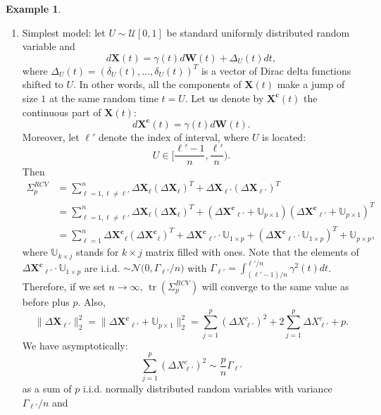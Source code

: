 \documentclass[a4paper,11pt]{article}
\theoremstyle{plain}
\theoremstyle{definition}
\newtheorem{exmp}[thm]{Example}
\newcommand{\tr}{\operatorname{tr}}
\begin{document}
    \begin{exmp} \label{uniform jumps} \
    	\begin{enumerate}
    		\item Simplest model: let $U \sim \mathcal{U}[0, 1]$ be standard uniformly distributed random variable and
    		\begin{equation}
    		d\mathbf{X}(t) = \gamma(t)  d\mathbf{W}(t) + \Delta_U(t)dt,
    		\end{equation}
    		where $\Delta_U(t) = (\delta_U(t), \dots, \delta_U(t))^T$ is a vector of Dirac delta functions shifted to $U$. In other words, all the components of $\mathbf{X}(t)$ make a jump of size $1$ at the same random time $t = U$. Let us denote by $\mathbf{X^c}(t)$ the continuous part of $\mathbf{X}(t)$:
    		\[ d\mathbf{X^c}(t) = \gamma(t) d\mathbf{W}(t). \]
    		Moreover, let $\ell'$ denote the index of interval, where $U$ is located:
    		\[ U \in \bigg[\frac{\ell'-1}{n}, \frac{\ell'}{n}\bigg). \]
    		Then
    		\[ 
    		\begin{aligned}
    		\Sigma_p^{RCV} & = \sum_{\ell=1, \ell \neq \ell'}^{n}\Delta \mathbf{X}_\ell(\Delta \mathbf{X}_\ell)^T + \Delta \mathbf{X}_{\ell'}(\Delta \mathbf{X}_{\ell'})^T\\
    		& = \sum_{\ell=1, \ell \neq \ell'}^{n}\Delta \mathbf{X}_\ell(\Delta \mathbf{X}_\ell)^T + (\Delta \mathbf{X^c}_{\ell'} + \mathbb{U}_{p \times 1})(\Delta \mathbf{X^c}_{\ell'} + \mathbb{U}_{p \times 1})^T\\
    		& =  \sum_{\ell=1}^{n}\Delta \mathbf{X^c}_\ell(\Delta \mathbf{X^c}_\ell)^T + \Delta \mathbf{X^c}_{\ell'} \cdot \mathbb{U}_{1 \times p} + (\Delta \mathbf{X^c}_{\ell'} \cdot \mathbb{U}_{1 \times p})^T + \mathbb{U}_{p \times p} ,
    		\end{aligned}
    		\]
    		where $\mathbb{U}_{k \times j}$ stands for $k \times j$ matrix filled with ones. Note that the elements of $\Delta \mathbf{X^c}_{\ell'} \cdot \mathbb{U}_{1 \times p}$ are i.i.d. $ \sim \mathcal{N}\big(0, \Gamma_{\ell'}/n )$ with $\Gamma_{\ell'}=\int_{(\ell' - 1)/n}^{\ell' / n} \gamma^2(t) dt$. Therefore, if we set $n \rightarrow \infty$, $\tr(\Sigma_p^{RCV})$ will converge to the same value as before plus $p$. Also,
    		\[
    		\| \Delta \mathbf{X}_{\ell'} \|_2^2 = \| \Delta \mathbf{X^c}_{\ell'} + \mathbb{U}_{p \times 1} \|_2^2  = \sum_{j=1}^{p} (\Delta X^c_{\ell'})^2 + 2\sum_{j=1}^{p} \Delta X^c_{\ell'} + p.
    		\]
    		We have asymptotically:
    		\[
    		\sum_{j=1}^{p} (\Delta X^c_{\ell'})^2 \sim \frac{p}{n}\Gamma_{\ell'}
    		\]
    		as a sum of $p$ i.i.d. normally distributed random variables with variance $\Gamma_{\ell'}/n$ and

\end{enumerate}
\end{exmp}
\end{document}
